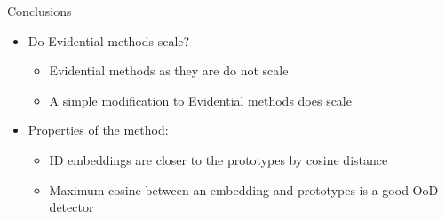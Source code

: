 \documentclass[]{beamer}
\begin{document}
\begin{frame}{Conclusions}
\begin{itemize}
    \item Do Evidential methods scale?
    \begin{itemize}
        \item Evidential methods as they are do not scale
        \item A simple modification to Evidential methods does scale \newline
    \end{itemize}
    \pause
    \item Properties of the method:
    \begin{itemize}
        \item ID embeddings are closer to the prototypes by cosine distance
        \item Maximum cosine between an embedding and prototypes is a good OoD detector
    \end{itemize}
\end{itemize}    
\end{frame}
\end{document}

